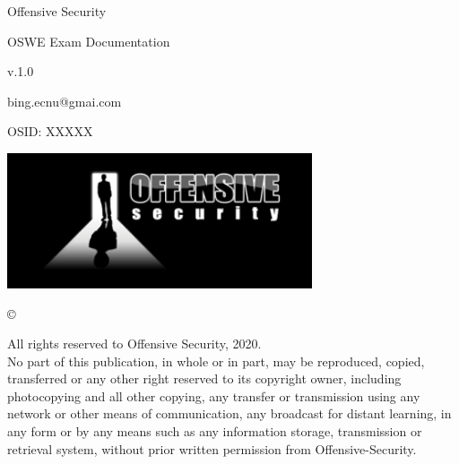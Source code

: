 \documentclass[a4paper]{article}
\begin{document}
\begin{titlepage}
  \begin{center}
      \vspace*{1cm}
          
      
      {\fontsize{48}{48}\selectfont \textcolor{myblue}{Offensive Security}}
          
      \vspace{0.5cm}
      {\fontsize{28}{28}\selectfont \textcolor{myblue}{OSWE Exam Documentation}}
          
      \vspace{1.5cm}
          
      v.1.0

      \vspace{1cm}

      {\fontsize{16}{16}\selectfont bing.ecnu@gmai.com}

      \vspace{1cm}

      {\fontsize{20}{20}\selectfont OSID: XXXXX}

      \vfill
          
      \includegraphics[width=9cm]{offsec.png}

      \vfill
      
      \copyright
          
      All rights reserved to Offensive Security, 2020.\\
      No part of this publication, in whole or in part, may be reproduced, copied, transferred or any other right reserved to its copyright owner, 
      including photocopying and all other copying, any transfer or transmission using any network or other means of communication, any broadcast
       for distant learning, in any form or by any means such as any information storage, transmission or retrieval system, without prior written
        permission from Offensive-Security.
      
          
      \vspace{0.8cm}
  
  \end{center}
  \thispagestyle{fancy}
\end{titlepage}
\end{document}
